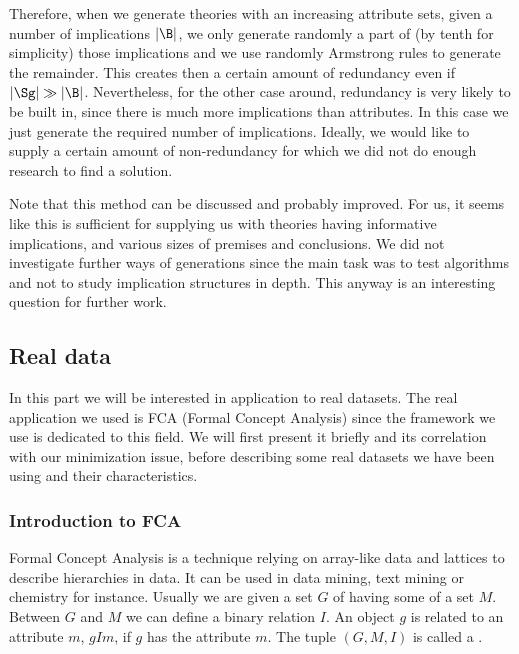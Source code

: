 \noindent Therefore, when we generate theories with an increasing attribute sets, given a number of implications $|\B|$, we only generate randomly a part of (by tenth for simplicity) those implications and we use randomly Armstrong rules to generate the remainder. This creates then a certain amount of redundancy even if $|\Sg| \gg |\B|$. Nevertheless, for the other case around, redundancy is very likely to be built in, since there is much more implications than attributes. In this case we just generate the required number of implications. Ideally, we would like to supply a certain amount of non-redundancy for which we did not do enough research to find a solution. 

\vspace{1.2em}

Note that this method can be discussed and probably improved. For us,
it seems like this is sufficient for supplying us with theories having informative implications, and various sizes of premises and conclusions. We did not investigate further ways of generations since the main task was to test algorithms and not to study implication structures in depth. This anyway is an interesting question for further work.

\subsection{Real data}

In this part we will be interested in application to real datasets. The real application we used is FCA (Formal Concept Analysis) since the framework we use is dedicated to this field. We will first present it briefly and its correlation with our minimization issue, before describing some real datasets we have been using and their characteristics.

\subsubsection{Introduction to FCA}

Formal Concept Analysis is a technique relying on array-like data and lattices
to describe hierarchies in data. It can be used in data mining, text mining or
chemistry for instance. Usually we are given a set $G$ of  having some  of a set $M$. Between $G$ and $M$ we can define
a binary relation $I$. An object $g$ is related to an attribute $m$, $gIm$, if
$g$ has the attribute $m$. The tuple $(G, M, I)$ is called a .

